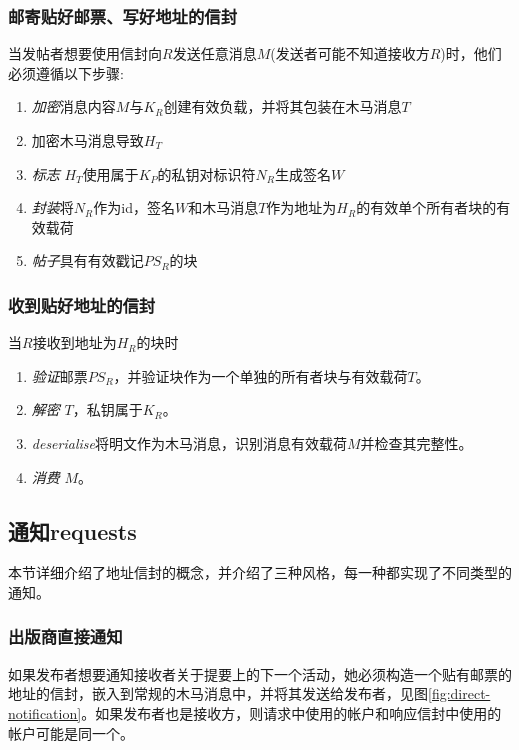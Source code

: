 \subsubsection{邮寄贴好邮票、写好地址的信封}

当发帖者想要使用信封向$R$发送任意消息$M$(发送者可能不知道接收方$R$)时，他们必须遵循以下步骤:

\begin{enumerate}
\item \emph{加密}消息内容$M$与$K_R$创建有效负载，并将其包装在木马消息$T$
\item 加密木马消息导致$H_T$
\item \emph{标志} $H_T$使用属于$K_P$的私钥对标识符$N_R$生成签名$W$
\item \emph{封装}将$N_R$作为id，签名$W$和木马消息$T$作为地址为$H_R$的有效单个所有者块的有效载荷
\item \emph{帖子}具有有效戳记$PS_R$的块
\end{enumerate}

\subsubsection{收到贴好地址的信封}

当$R$接收到地址为$H_R$的块时

\begin{enumerate}
\item \emph{验证}邮票$PS_R$，并验证块作为一个单独的所有者块与有效载荷$T$。
\item \emph{解密} $T$，私钥属于$K_R$。
\item \emph{deserialise}将明文作为木马消息，识别消息有效载荷$M$并检查其完整性。
\item \emph{消费} $M$。
\end{enumerate}

\subsection{通知requests\statusgreen}\label{sec:notification-requests} 


本节详细介绍了地址信封的概念，并介绍了三种风格，每一种都实现了不同类型的通知。

\subsubsection{出版商直接通知}

如果发布者想要通知接收者关于提要上的下一个活动，她必须构造一个贴有邮票的地址的信封，嵌入到常规的木马消息中，并将其发送给发布者，见图\ref{fig:direct-notification}。如果发布者也是接收方，则请求中使用的帐户和响应信封中使用的帐户可能是同一个。 



